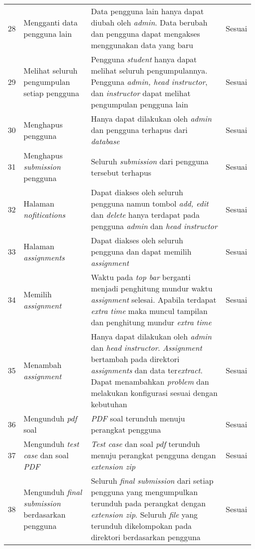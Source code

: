 \begin{longtable}[H]{|p{0.5cm}| p{5.5cm}| p{6cm}| p{2.5cm}|}
28 & Mengganti data pengguna lain & Data pengguna lain hanya dapat diubah oleh \textit{admin}. Data berubah dan pengguna dapat mengakses menggunakan data yang baru & Sesuai\\ \cline{1-4}
29 & Melihat seluruh pengumpulan setiap pengguna & Pengguna \textit{student} hanya dapat melihat seluruh pengumpulannya. Pengguna \textit{admin, head instructor}, dan \textit{instructor} dapat melihat pengumpulan pengguna lain & Sesuai\\ \cline{1-4}
30 & Menghapus pengguna & Hanya dapat dilakukan oleh \textit{admin} dan pengguna terhapus dari \textit{database} & Sesuai\\ \cline{1-4}
31 & Menghapus \textit{submission} pengguna & Seluruh \textit{submission} dari pengguna tersebut terhapus & Sesuai\\ \cline{1-4}
32 & Halaman \textit{nofitications} & Dapat diakses oleh seluruh pengguna namun tombol \textit{add, edit} dan \textit{delete} hanya terdapat pada pengguna \textit{admin} dan \textit{head instructor} & Sesuai\\ \cline{1-4}
33 & Halaman \textit{assignments} & Dapat diakses oleh seluruh pengguna dan dapat memilih \textit{assignment} & Sesuai\\ \cline{1-4}
34 & Memilih \textit{assignment} & Waktu pada \textit{top bar} berganti menjadi penghitung mundur waktu \textit{assignment} selesai. Apabila terdapat \textit{extra time} maka muncul tampilan dan penghitung mundur \textit{extra time} & Sesuai\\ \cline{1-4}
35 & Menambah \textit{assignment} & Hanya dapat dilakukan oleh \textit{admin} dan \textit{head instructor}. \textit{Assignment} bertambah pada direktori \textit{assignments} dan data ter\textit{extract}. Dapat menambahkan \textit{problem} dan melakukan konfigurasi sesuai dengan kebutuhan & Sesuai\\ \cline{1-4}
36 & Mengunduh \textit{pdf} soal & \textit{PDF} soal terunduh menuju perangkat pengguna & Sesuai\\ \cline{1-4}
37 & Mengunduh \textit{test case} dan soal \textit{PDF} & \textit{Test case} dan soal \textit{pdf} terunduh menuju perangkat pengguna dengan \textit{extension zip} & Sesuai\\ \cline{1-4}
38 & Mengunduh \textit{final submission} berdasarkan pengguna & Seluruh \textit{final submission} dari setiap pengguna yang mengumpulkan terunduh pada perangkat dengan \textit{extension zip}. Seluruh \textit{file} yang terunduh dikelompokan pada direktori berdasarkan pengguna & Sesuai\\ \cline{1-4}

\end{longtable}
